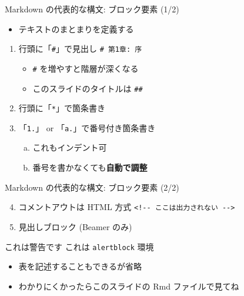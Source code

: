 \documentclass[
  ignorenonframetext,
]{beamer}
\providecommand{\tightlist}{%
  \setlength{\itemsep}{0pt}\setlength{\parskip}{0pt}}
\begin{document}
\begin{frame}[fragile]{Markdown の代表的な構文: ブロック要素 (1/2)}
\protect\hypertarget{markdown-ux306eux4ee3ux8868ux7684ux306aux69cbux6587-ux30d6ux30edux30c3ux30afux8981ux7d20-12}{}
\begin{itemize}
\tightlist
\item
  テキストのまとまりを定義する
\end{itemize}

\begin{enumerate}
\item
  行頭に「\texttt{\#}」で見出し \texttt{\#\ 第1章:\ 序}

  \begin{itemize}
  \tightlist
  \item
    \texttt{\#} を増やすと階層が深くなる
  \item
    このスライドのタイトルは \texttt{\#\#}
  \end{itemize}
\item
  行頭に「\texttt{*}」で箇条書き

\item
  「\texttt{1.}」 or 「\texttt{a.}」で番号付き箇条書き

  \begin{enumerate}
  [a.]
  \tightlist
  \item
    これもインデント可
  \item
    番号を書かなくても\textbf{自動で調整}
  \end{enumerate}
\end{enumerate}
\end{frame}

\begin{frame}[fragile]{Markdown の代表的な構文: ブロック要素 (2/2)}
\protect\hypertarget{markdown-ux306eux4ee3ux8868ux7684ux306aux69cbux6587-ux30d6ux30edux30c3ux30afux8981ux7d20-22}{}
\begin{enumerate}
\setcounter{enumi}{3}
\item
  コメントアウトは HTML 方式 \texttt{\textless{}!-\/-\ ここは出力されない\ -\/-\textgreater{}}
\item
  見出しブロック (Beamer のみ)
\end{enumerate}

\begin{alertblock}{これは警告です}
これは \texttt{alertblock} 環境

\end{alertblock}

\begin{itemize}
\tightlist
\item
  表を記述することもできるが省略
\item
  わかりにくかったらこのスライドの Rmd ファイルで見てね
\end{itemize}
\end{frame}
\end{document}
